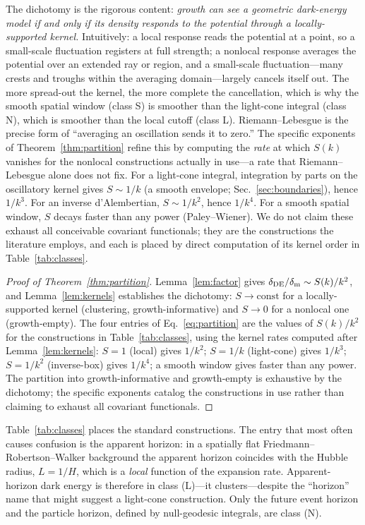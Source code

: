 \documentclass[twocolumn,10pt]{article}
\newcommand{\dDE}{\delta_{\rm DE}}
\newcommand{\dm}{\delta_{\rm m}}
\begin{document}
The dichotomy is the rigorous content: \emph{growth can see a geometric
dark-energy model if and only if its density responds to the potential through
a locally-supported kernel.} Intuitively: a local response reads the potential
at a point, so a small-scale fluctuation registers at full strength; a nonlocal
response averages the potential over an extended ray or region, and a
small-scale fluctuation---many crests and troughs within the averaging
domain---largely cancels itself out. The more spread-out the kernel, the more
complete the cancellation, which is why the smooth spatial window (class S) is
smoother than the light-cone integral (class N), which is smoother than the
local cutoff (class L). Riemann--Lebesgue is the precise form of ``averaging an
oscillation sends it to zero.'' The specific exponents of
Theorem~\ref{thm:partition} refine this by computing the \emph{rate} at which
$S(k)$ vanishes for the nonlocal constructions actually in use---a rate that
Riemann--Lebesgue alone does not fix. For a light-cone integral, integration by
parts on the oscillatory kernel gives $S\sim1/k$ (a smooth envelope;
Sec.~\ref{sec:boundaries}), hence $1/k^3$. For an inverse d'Alembertian,
$S\sim1/k^2$, hence $1/k^4$. For a smooth spatial window, $S$ decays faster than
any power (Paley--Wiener). We do not claim these exhaust all conceivable
covariant functionals; they are the constructions the literature employs, and
each is placed by direct computation of its kernel order in
Table~\ref{tab:classes}.

\begin{proof}[Proof of Theorem~\ref{thm:partition}]
Lemma~\ref{lem:factor} gives $\dDE/\dm\sim S(k)/k^2$, and
Lemma~\ref{lem:kernels} establishes the dichotomy: $S\!\to\!\mathrm{const}$ for
a locally-supported kernel (clustering, growth-informative) and $S\!\to\!0$ for
a nonlocal one (growth-empty). The four entries of
Eq.~\eqref{eq:partition} are the values of $S(k)/k^2$ for the constructions in
Table~\ref{tab:classes}, using the kernel rates computed after
Lemma~\ref{lem:kernels}: $S=1$ (local) gives $1/k^2$; $S=1/k$ (light-cone) gives
$1/k^3$; $S=1/k^2$ (inverse-box) gives $1/k^4$; a smooth window gives faster
than any power. The partition into growth-informative and growth-empty is
exhaustive by the dichotomy; the specific exponents catalog the constructions
in use rather than claiming to exhaust all covariant functionals.
\end{proof}

Table~\ref{tab:classes} places the standard constructions. The entry that most
often causes confusion is the apparent horizon: in a spatially flat
Friedmann--Robertson--Walker background the apparent horizon coincides with the
Hubble radius, $L=1/H$, which is a \emph{local} function of the expansion rate.
Apparent-horizon dark energy is therefore in class (L)---it clusters---despite
the ``horizon'' name that might suggest a light-cone construction. Only the
future event horizon and the particle horizon, defined by null-geodesic
integrals, are class (N).
\end{document}
